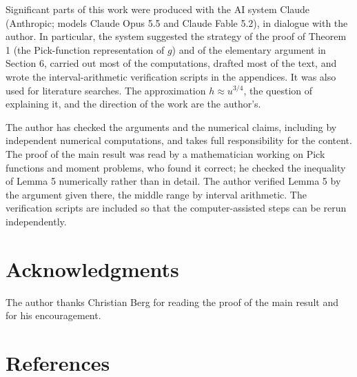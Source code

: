 \documentclass[
  11pt,
]{article}
\begin{document}
Significant parts of this work were produced with the AI system Claude
(Anthropic; models Claude Opus 5.5 and Claude Fable 5.2), in dialogue
with the author. In particular, the system suggested the strategy of the
proof of Theorem 1 (the Pick-function representation of \(g\)) and of
the elementary argument in Section 6, carried out most of the
computations, drafted most of the text, and wrote the
interval-arithmetic verification scripts in the appendices. It was also
used for literature searches. The approximation \(h \approx u^{3/4}\),
the question of explaining it, and the direction of the work are the
author's.

The author has checked the arguments and the numerical claims, including
by independent numerical computations, and takes full responsibility for
the content. The proof of the main result was read by a mathematician
working on Pick functions and moment problems, who found it correct; he
checked the inequality of Lemma 5 numerically rather than in detail. The
author verified Lemma 5 by the argument given there, the middle range by
interval arithmetic. The verification scripts are included so that the
computer-assisted steps can be rerun independently.

\hypertarget{acknowledgments}{%
\section*{Acknowledgments}\label{acknowledgments}}

The author thanks Christian Berg for reading the proof of the main
result and for his encouragement.

\hypertarget{references}{%
\section*{References}\label{references}}
\end{document}
